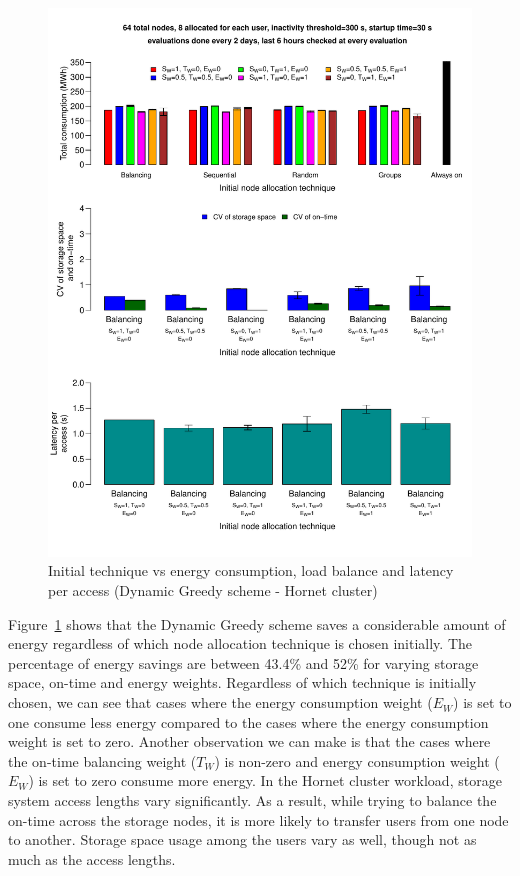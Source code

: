 \begin{figure}[!htbp]
\centering
\includegraphics[width=\columnwidth,keepaspectratio]{FIG9.pdf}
\caption{Initial technique vs energy consumption, load balance and latency per access (Dynamic Greedy scheme - Hornet cluster)}
\label{fourthresult}
\end{figure}

Figure~\ref{fourthresult} shows that the Dynamic Greedy scheme saves a considerable amount of energy regardless of
which node allocation technique is chosen initially. The percentage of energy savings are between 43.4\% and 52\%
for varying storage space, on-time and energy weights. Regardless of which technique is initially chosen, we can
see that cases where the energy consumption weight ($E_W$) is set to one consume less energy compared to the cases
where the energy consumption weight is set to zero. Another observation we can make is that the cases where the
on-time balancing weight ($T_W$) is non-zero and energy consumption weight ($E_W$) is set to zero consume more
energy. In the Hornet cluster workload, storage system access lengths vary significantly. As a result,
while trying to balance the on-time across the storage nodes, it is more likely to transfer users from one node
to another. Storage space usage among the users vary as well, though not as much as the access lengths.

